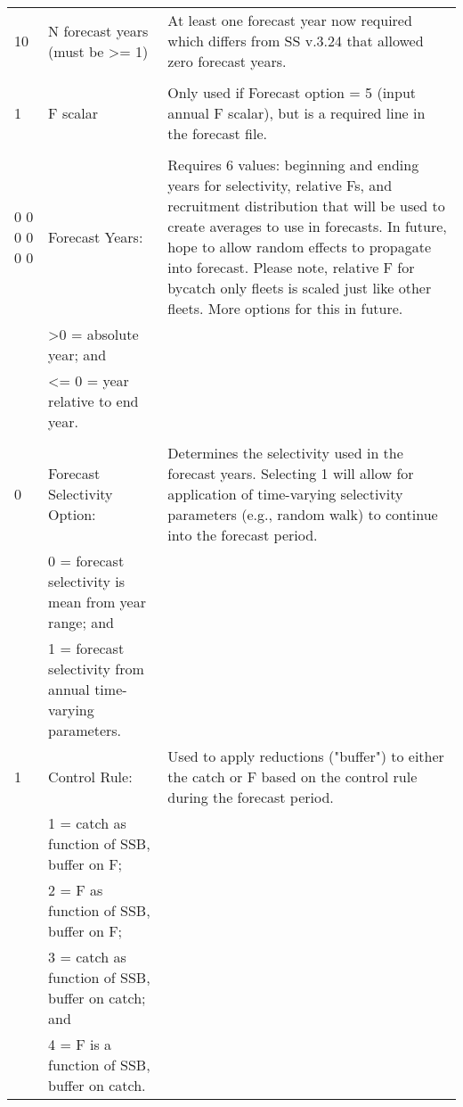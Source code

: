 \begin{landscape}
{\begin{longtable}{p{3.2cm} p{7cm} p{10.8cm}}
  \hline
  10 & N forecast years (must be >= 1) &  \multirow{1}{1cm}[-0.25cm]{\parbox{11cm }{ At least one forecast year now required which differs from SS v.3.24 that allowed zero forecast years.}} \Tstrut\\
     & & \Bstrut\\
     
  \hline
  1 & F scalar & \multirow{1}{1cm}[-0.10cm]{\parbox{11cm}{Only used if Forecast option = 5 (input annual F scalar), but is a required line in the forecast file.}}\Tstrut\Bstrut\\
  & & \\
  
  \hline
  0 0 0 0 0 0 & Forecast Years: &  \multirow{1}{1cm}[-0.25cm]{\parbox{11cm}{Requires 6 values: beginning and ending years for selectivity, relative Fs, and recruitment distribution that will be used to create averages to use in forecasts.  In future, hope to allow random effects to propagate into forecast. Please note, relative F for bycatch only fleets is scaled just like other fleets.  More options for this in future.}}\Tstrut\\
    & >0 = absolute year; and & \\
    & <= 0 = year relative to end year. & \\
    & & \Bstrut\\  

 \pagebreak   
 0 & Forecast Selectivity Option: & \multirow{1}{1cm}[-0.25cm]{\parbox{11cm}{Determines the selectivity used in the forecast years. Selecting 1 will allow for application of time-varying selectivity parameters (e.g., random walk) to continue into the forecast period.}}\Tstrut\\
   & 0 = forecast selectivity is mean from year range; and & \\
   & 1 = forecast selectivity from annual time-varying parameters. & \Bstrut\\

 \hline   
 1 & Control Rule: & \multirow{1}{1cm}[-0.25cm]{\parbox{11cm}{Used to apply reductions ("buffer") to either the catch or F based on the control rule during the forecast period.}} \Tstrut\\
   & 1 = catch as function of SSB, buffer on F; & \\
   & 2 = F as function of SSB, buffer on F; & \\
   & 3 = catch as function of SSB, buffer on catch; and & \\
   & 4 = F is a function of SSB, buffer on catch. & \Bstrut\\
 \hline
 

\end{longtable}}
\end{landscape}
